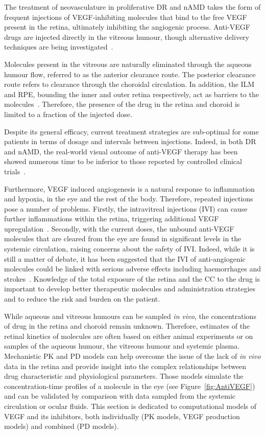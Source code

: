 \documentclass{article}
\begin{document}
The treatment of neovasculature in proliferative DR and nAMD takes the form of frequent injections of VEGF-inhibiting molecules that bind to the free VEGF present in the retina, ultimately inhibiting the angiogenic process.
Anti-VEGF drugs are injected directly in the vitreous humour, though alternative delivery techniques are being investigated~\cite{Kim_2021}.

Molecules present in the vitreous are naturally eliminated through the aqueous humour flow, referred to as the anterior clearance route.
The posterior clearance route refers to clearance through the choroidal circulation.
In addition, the ILM and RPE, bounding the inner and outer retina respectively, act as barriers to the molecules~\cite{Park_2015}.
Therefore, the presence of the drug in the retina and choroid is limited to a fraction of the injected dose. 

Despite its general efficacy, current treatment strategies are sub-optimal for some patients in terms of dosage and intervals between injections.
Indeed, in both DR and nAMD, the real-world visual outcome of anti-VEGF therapy has been showed numerous time to be inferior to those reported by controlled clinical trials~\cite{Ciulla_2018, Ciulla_2020, Ozturk_2017}.

Furthermore, VEGF induced angiogenesis is a natural response to inflammation and hypoxia, in the eye and the rest of the body. 
Therefore, repeated injections pose a number of problems.
Firstly, the intravitreal injections (IVI) can cause further inflammations within the retina, triggering additional VEGF upregulation~\cite{Iyer_2022}.
Secondly, with the current doses, the unbound anti-VEGF molecules that are cleared from the eye are found in significant levels in the systemic circulation, raising concerns about the safety of IVI.
Indeed, while it is still a matter of debate, it has been suggested that the IVI of anti-angiogenic molecules could be linked with serious adverse effects including haemorrhages and strokes~\cite{Avery_2016, Kaiser_2019, Maloney_2021}.
Knowledge of the total exposure of the retina and the CC to the drug is important to develop better therapeutic molecules and administration strategies and to reduce the risk and burden on the patient.

While aqueous and vitreous humours can be sampled \textit{in vivo}, the concentrations of drug in the retina and choroid remain unknown. 
Therefore, estimates of the retinal kinetics of molecules are often based on either animal experiments or on samples of the aqueous humour, the vitreous humour and systemic plasma.
Mechanistic PK and PD models can help overcome the issue of the lack of \textit{in vivo} data in the retina and provide insight into the complex relationships between drug characteristic and physiological parameters.
Those models simulate the concentration-time profiles of a molecule in the eye (see Figure~\ref{fig:AntiVEGF}) and can be validated by comparison with data sampled from the systemic circulation or ocular fluids.
This section is dedicated to computational models of VEGF and its inhibitors, both individually (PK models, VEGF production models) and combined (PD models).
\end{document}
